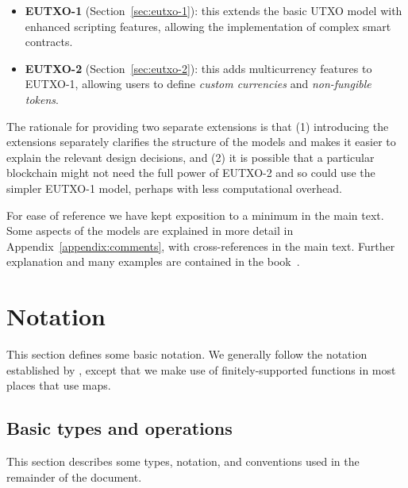 \documentclass[a4paper]{article}
\begin{document}
\begin{itemize}
  \item \textbf{EUTXO-1} (Section~\ref{sec:eutxo-1}): this extends the
    basic UTXO model with enhanced scripting features, allowing the
    implementation of complex smart contracts.
  \item \textbf{EUTXO-2} (Section~\ref{sec:eutxo-2}): this adds
    multicurrency features to EUTXO-1, allowing users to define
    \textit{custom currencies} and \textit{non-fungible tokens}.
\end{itemize}


\medskip

The rationale for providing two separate extensions is that (1)
introducing the extensions separately clarifies the structure of the
models and makes it easier to explain the relevant design decisions,
and (2) it is possible that a particular blockchain might not need the
full power of EUTXO-2 and so could use the simpler EUTXO-1 model,
perhaps with less computational overhead.

\medskip

For ease of reference we have kept exposition to a minimum in the main
text.  Some aspects of the models are explained in more detail
in Appendix~\ref{appendix:comments}, with cross-references in the main
text.  Further explanation and many examples are contained in the
book~\citep{Plutus-book}.


\section{Notation}
This section defines some basic notation.  We generally follow the
notation established by \citep{Zahnentferner18-UTxO}, except that we make use
of finitely-supported functions in most places that \citep{Zahnentferner18-UTxO}
use maps.

\subsection{Basic types and operations}
\label{sec:basic-notation}

This section describes some types, notation, and
conventions used in the remainder of the document.
\end{document}
